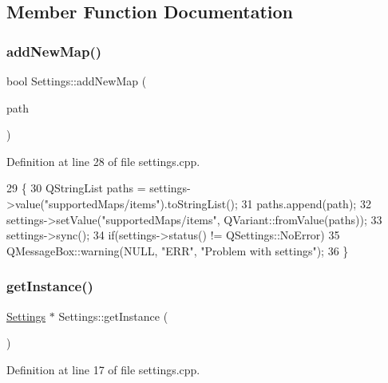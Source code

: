 \subsection{Member Function Documentation}
\mbox{\label{class_settings_a5dcb3f0c7e2e145a4553edd78cf5fa5c}} 
\subsubsection{\texorpdfstring{add\+New\+Map()}{addNewMap()}}
{\footnotesize\ttfamily bool Settings\+::add\+New\+Map (\begin{DoxyParamCaption}\item[{Q\+String}]{path }\end{DoxyParamCaption})}



Definition at line 28 of file settings.\+cpp.


\begin{DoxyCode}
29 \{
30     QStringList paths = settings->value(\textcolor{stringliteral}{"supportedMaps/items"}).toStringList();
31     paths.append(path);
32     settings->setValue(\textcolor{stringliteral}{"supportedMaps/items"}, QVariant::fromValue(paths));
33     settings->sync();
34     \textcolor{keywordflow}{if}(settings->status() != QSettings::NoError)
35         QMessageBox::warning(NULL, \textcolor{stringliteral}{"ERR"}, \textcolor{stringliteral}{"Problem with settings"});
36 \}
\end{DoxyCode}
\mbox{\label{class_settings_a5134bac1c68824ef48651c8469cf8722}} 
\subsubsection{\texorpdfstring{get\+Instance()}{getInstance()}}
{\footnotesize\ttfamily \hyperlink{class_settings}{Settings} $\ast$ Settings\+::get\+Instance (\begin{DoxyParamCaption}{ }\end{DoxyParamCaption})\hspace{0.3cm}{\ttfamily [static]}}



Definition at line 17 of file settings.\+cpp.


